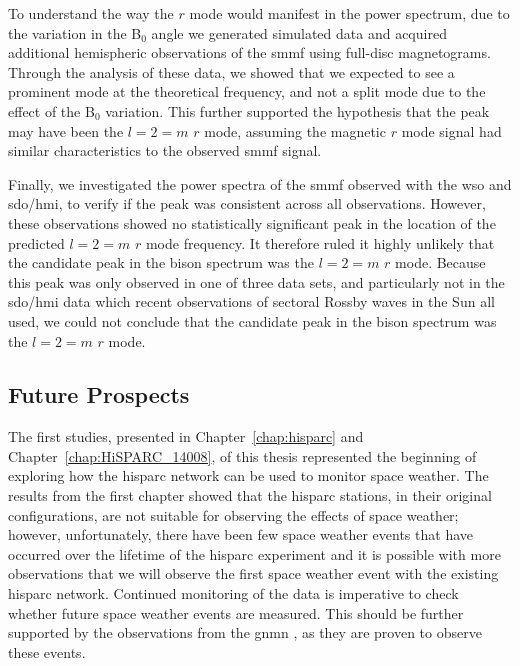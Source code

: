 To understand the way the $r$ mode would manifest in the power spectrum, due to the variation in the B$_0$ angle we generated simulated data and acquired additional  hemispheric observations of the \gls{smmf} using full-disc magnetograms. Through the analysis of these data, we showed that we expected to see a prominent mode at the theoretical frequency, and not a split mode due to the effect of the B$_0$ variation. This further supported the hypothesis that the peak may have been the $l=2=m$ $r$ mode, assuming the magnetic $r$ mode signal had similar characteristics to the observed \gls{smmf} signal.

Finally, we investigated the power spectra of the \gls{smmf} observed with the \gls{wso} and \gls{sdo/hmi}, to verify if the peak was consistent across all observations. However, these observations showed no statistically significant peak in the location of the predicted $l=2=m$ $r$ mode frequency. It therefore ruled it highly unlikely that the candidate peak in the \gls{bison} spectrum was the $l=2=m$ $r$ mode. Because this peak was only observed in one of three data sets, and particularly not in the \gls{sdo/hmi} data which recent observations of sectoral Rossby waves in the Sun all used, we could not conclude that the candidate peak in the \gls{bison} spectrum was the $l=2=m$ $r$ mode. 


\subsection*{Future Prospects}

The first studies, presented in Chapter~\ref{chap:hisparc} and Chapter~\ref{chap:HiSPARC_14008}, of this thesis represented the beginning of exploring how the \gls{hisparc} network can be used to monitor space weather. The results from the first chapter showed that the \gls{hisparc} stations, in their original configurations, are not suitable for observing the effects of space weather; however, unfortunately, there have been few space weather events that have occurred over the lifetime of the \gls{hisparc} experiment and it is possible with more observations that we will observe the first space weather event with the existing \gls{hisparc} network. Continued monitoring of the data is imperative to check whether future space weather events are measured. This should be further supported by the observations from the \gls{gnmn} \citep{mishev_current_2020}, as they are proven to observe these events.

